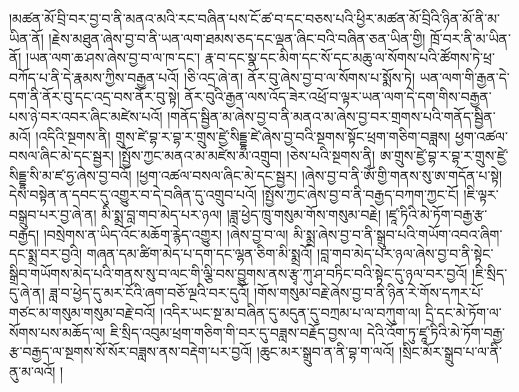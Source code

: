 །མཚན་མོ་བྲི་བར་བྱ་བ་ནི་མནའ་མའི་རང་བཞིན་པས་ངོ་ཚ་བ་དང་བཅས་པའི་ཕྱིར་མཚན་མོ་བྲིའི་ཉིན་མོ་ནི་མ་ཡིན་ནོ། །རྗེས་མཐུན་ཞེས་བྱ་བ་ནི་ཡན་ལག་ཐམས་ཅད་དང་ལྡན་ཞིང་བའི་བཞིན་ཅན་ཡིན་གྱི། ཁྲོ་བར་ནི་མ་ཡིན་ནོ། །ཡན་ལག་ཆ་ཤས་ཞེས་བྱ་བ་ལ་ཁ་དང་། རྣ་བ་དང་སྣ་དང་མིག་དང་སོ་དང་མཆུ་ལ་སོགས་པའི་ཚོགས་ཏེ་ཕྲ་བཀོད་པ་ནི་དེ་རྣམས་ཀྱིས་བརྒྱན་པའོ། །ཅི་འདྲ་ཞེ་ན། ནོར་བུ་ཞེས་བྱ་བ་ལ་སོགས་པ་སྨོས་ཏེ། ཡན་ལག་གི་རྒྱན་དེ་དག་ནི་ནོར་བུ་དང་འདྲ་བས་ནོར་བུ་སྟེ། ནོར་བུའི་རྒྱན་ལས་འོད་ཟེར་འཕྲོ་བ་ལྟར་ཡན་ལག་དེ་དག་གིས་བརྒྱན་པས་ཉེ་བར་འབར་ཞིང་མཛེས་པའོ། །གནོད་སྦྱིན་མ་ཞེས་བྱ་བ་ནི་མནའ་མ་ཞེས་བྱ་བར་གྲགས་པའི་གནོད་སྦྱིན་མའོ། །འདིའི་སྔགས་ནི། གྲུས་ཛེ་བྷ་ར་བྷ་ར་གྲུས་ཛྱེ་སིདྡྷ་ཛེ་ཞེས་བྱ་བའི་སྔགས་སྟོང་ཕྲག་གཅིག་བཟླས། ཕྱག་འཚལ་བསལ་ཞིང་མེ་དང་སྦྱར། །སྤྱོས་ཀྱང་མནའ་མ་མཛེས་མ་འགྲུབ། །ཅེས་པའི་སྔགས་ནི། ཨ་གྲུས་ཛྱེ་བྷ་ར་བྷ་ར་གྲུས་ཛྱེ་སིདྡྷ་སི་མ་ཛ་ཧྱ་ཞེས་བྱ་བའོ། །ཕྱག་འཚལ་བསལ་ཞིང་མེ་དང་སྦྱར། །ཞེས་བྱ་བ་ནི་ཨོཾ་གྱི་གནས་སུ་ཨ་གདོན་པ་སྟེ། དེས་བསྟེན་ན་དབང་དུ་འགྱུར་བ་དེ་བཞིན་དུ་འགྲུབ་པའོ། །སྤྱོས་ཀྱང་ཞེས་བྱ་བ་ནི་བརྒྱད་བཀག་ཀྱང་ངོ། །ཇི་ལྟར་བསྒྲུབ་པར་བྱ་ཞེ་ན། མི་སྨྲ་བླ་གབ་མེད་པར་ཉལ། །ཟླ་ཕྱེད་ཁྲུ་གསུམ་གོས་གསུམ་བརྗེ། །ཛཱ་ཏིའི་མེ་ཏོག་བརྒྱ་རྩ་བརྒྱད། །བསྲེགས་ན་ཡིད་འོང་མཆོག་རྙེད་འགྱུར། །ཞེས་བྱ་བ་ལ། མི་སྨྲ་ཞེས་བྱ་བ་ནི་སྒྲུབ་པའི་གཡོག་འབའ་ཞིག་དང་སྨྲ་བར་བྱའི། གཞན་དམ་ཚིག་མེད་པ་དག་དང་ལྷན་ཅིག་མི་སྨྲའོ། །བླ་གབ་མེད་པར་ཉལ་ཞེས་བྱ་བ་ནི་སྟེང་སྒྲིབ་གཡོགས་མེད་པའི་གནས་སུ་བ་ལང་གི་ལྕི་བས་བྱུགས་ནས་རྩྭ་ཀུ་ཤ་བཏིང་བའི་སྟེང་དུ་ཉལ་བར་བྱའོ། །ཇི་སྲིད་དུ་ཞེ་ན། ཟླ་བ་ཕྱེད་དུ་མར་ངོའི་ཞག་བཅོ་ལྔའི་བར་དུའོ། །གོས་གསུམ་བརྗེ་ཞེས་བྱ་བ་ནི་ཉིན་རེ་གོས་དཀར་པོ་གཙང་མ་གསུམ་གསུམ་བརྗེ་བའོ། །འདིར་ཡང་སྔ་མ་བཞིན་དུ་མདུན་དུ་བཀྲམ་པ་ལ་བཀུག་ལ། དྲི་དང་མེ་ཏོག་ལ་སོགས་པས་མཆོད་ལ། ཇི་སྲིད་འབུམ་ཕྲག་གཅིག་གི་བར་དུ་བཟླས་བརྗོད་བྱས་ལ། དེའི་འོག་ཏུ་ཛཱ་ཏིའི་མེ་ཏོག་བརྒྱ་རྩ་བརྒྱད་ལ་སྔགས་སོ་སོར་བཟླས་ནས་བརྡེག་པར་བྱའོ། །ཆུང་མར་སྒྲུབ་ན་ནི་བྷ་ག་ལའོ། །སྲིང་མོར་སྒྲུབ་པ་ལ་ནི་ནུ་མ་ལའོ། །
